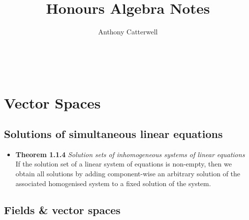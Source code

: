 \documentclass[11pt,a4paper]{article}
\title{Honours Algebra Notes}
\author{Anthony Catterwell}
\begin{document}
\maketitle
\tableofcontents

\break\

\section{Vector Spaces}

\subsection{Solutions of simultaneous linear equations}

\begin{itemize}

    \item \textbf{Theorem 1.1.4} \emph{Solution sets of inhomogeneous systems of linear
        equations} \\
        If the solution set of a linear system of equations is non-empty,
        then we obtain all solutions by adding component-wise an arbitrary solution
        of the associated homogenised system to a fixed solution of the system.

\end{itemize}

\subsection{Fields \& vector spaces}
\end{document}
